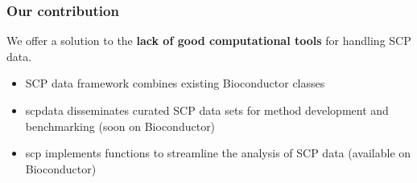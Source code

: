 \documentclass{beamer}
\newcommand{\hcode}[2][lgray]{{\ttfamily\color{vdgray}\colorbox{#1}{#2}}}
\begin{document}
\begin{frame}
  \frametitle{Our contribution}
  
  We offer a solution to the \textbf{lack of good computational tools}
  for handling SCP data.

  \vfill
  \begin{itemize}
    \item SCP data framework combines existing Bioconductor classes
    \item \hcode{scpdata} disseminates curated SCP data sets 
    for method development and benchmarking (soon on Bioconductor)
    \item \hcode{scp} implements functions to streamline the 
    analysis of SCP data (available on Bioconductor)
  \end{itemize}

\end{frame}
\end{document}
